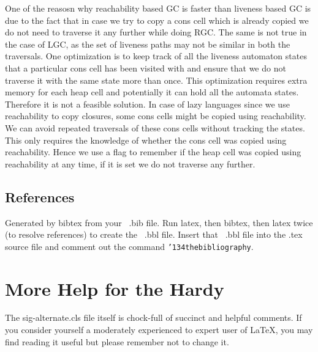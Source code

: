\documentclass[10pt]{sigplanconf}
\begin{document}
One of the reasosn why reachability based GC is faster than liveness based GC is due to the fact that 
in case we try to copy a cons cell which is already copied we do not need to traverse it any further while
 doing RGC. The same is not true in the case of LGC, as the set of liveness paths may not be similar in 
both the traversals. One optimization is to keep track of all the liveness automaton states that a particular 
cons cell has been visited with and ensure that we do not traverse it with the same state more than once. 
This optimization requires extra memory for each heap cell and potentially it can hold all the automata states. 
Therefore it is not a feasible solution. In case of lazy languages since we use reachability to copy closures, 
some cons cells might be copied using reachability. We can avoid repeated traversals of these cons cells without 
tracking the states. This only requires the knowledge of whether the cons cell was copied using reachability. 
Hence we use a flag to remember if the heap cell was copied using reachability at any time, if it is set we do 
not traverse any further.

\subsection{References}
{}


Generated by bibtex from your ~.bib file.  Run latex,
then bibtex, then latex twice (to resolve references)
to create the ~.bbl file.  Insert that ~.bbl file into
the .tex source file and comment out
the command \texttt{{\char'134}thebibliography}.
\section{More Help for the Hardy}
The sig-alternate.cls file itself is chock-full of succinct
and helpful comments.  If you consider yourself a moderately
experienced to expert user of \LaTeX, you may find reading
it useful but please remember not to change it.
\end{document}
